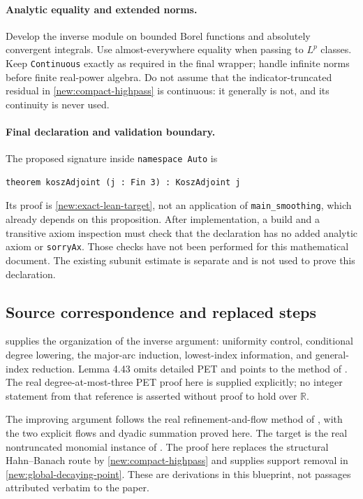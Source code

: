 \documentclass[11pt]{article}
\theoremstyle{definition}
\newcommand{\pid}[1]{\nolinkurl{#1}}
\newcommand{\R}{\mathbb R}
\begin{document}
\paragraph{Analytic equality and extended norms.}
Develop the inverse module on bounded Borel functions and absolutely convergent integrals.
Use almost-everywhere equality when passing to $L^p$ classes. Keep \pid{Continuous} exactly
as required in the final wrapper; handle infinite norms before finite real-power algebra.
Do not assume that the indicator-truncated residual in \cref{new:compact-highpass} is
continuous: it generally is not, and its continuity is never used.

\paragraph{Final declaration and validation boundary.}
The proposed signature inside \pid{namespace Auto} is
\begin{verbatim}
theorem koszAdjoint (j : Fin 3) : KoszAdjoint j
\end{verbatim}
Its proof is \cref{new:exact-lean-target}, not an application of \pid{main_smoothing}, which
already depends on this proposition. After implementation, a build and a transitive axiom
inspection must check that the declaration has no added analytic axiom or \pid{sorryAx}.
Those checks have not been performed for this mathematical document. The existing subunit
estimate is separate and is not used to prove this declaration.

\subsection{Source correspondence and replaced steps}
\cite[Sections 4.2--4.5]{KoszEtAl} supplies the organization of the inverse argument:
uniformity control, conditional degree lowering, the major-arc induction, lowest-index
information, and general-index reduction. Lemma 4.43 omits detailed PET and points to the
method of \cite[Proposition 4.8]{KKL}. The real degree-at-most-three PET proof here is supplied
explicitly; no integer statement from that reference is asserted without proof to hold over
$\R$.

The improving argument follows the real refinement-and-flow method of
\cite[Section 5.6]{KoszEtAl}, with the two explicit flows and dyadic summation proved here.
The target is the real nontruncated monomial instance of \cite[Theorem 6.13]{KoszEtAl}.
The proof here replaces the structural Hahn--Banach route by \cref{new:compact-highpass}
and supplies support removal in \cref{new:global-decaying-point}. These are derivations in
this blueprint, not passages attributed verbatim to the paper.
\end{document}
